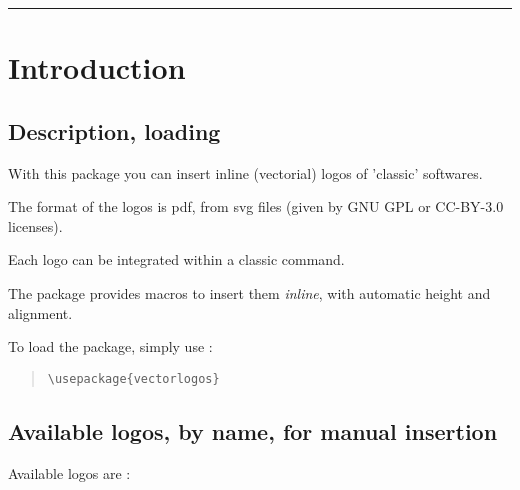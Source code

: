 \documentclass[11pt,a4paper]{ltxdoc}
\begin{document}
\hypertarget{matoc}{}

\tableofcontents

\vspace*{5mm}

\hrule

\vspace*{5mm}

\section{Introduction}

\subsection{Description, loading}

With this package you can insert inline (vectorial) logos of 'classic' softwares.

The format of the logos is \textsf{pdf}, from \textsf{svg} files (given by \textsf{GNU GPL} or \textsf{CC-BY-3.0} licenses).

\medskip

Each logo can be integrated within a classic  command.

The package provides macros to insert them \textit{inline}, with automatic height and alignment.

\medskip

To load the package, simply use :

\begin{quote}
\begin{verbatim}
\usepackage{vectorlogos}
\end{verbatim}
\end{quote}

\subsection{Available logos, by name, for manual insertion}

Available logos are :

\medskip
\end{document}
